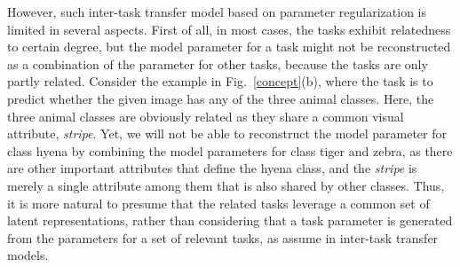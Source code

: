 \documentclass{article}
\begin{document}
	However, such inter-task transfer model based on parameter regularization is limited in several aspects. First of all, in most cases, the tasks exhibit relatedness to certain degree, but the model parameter for a task might not be reconstructed as a combination of the parameter for other tasks, because the tasks are only partly related. Consider the example in Fig.~\ref{concept}(b), where the task is to predict whether the given image has any of the three animal classes. Here, the three animal classes are obviously related as they share a common visual attribute, \emph{stripe}. Yet, we will not be able to reconstruct the model parameter for class hyena by combining the model parameters for class tiger and zebra, as there are other important attributes that define the hyena class, and the \emph{stripe} is merely a single attribute among them that is also shared by other classes. Thus, it is more natural to presume that the related tasks leverage a common set of latent representations, rather than considering that a task parameter is generated from the parameters for a set of relevant tasks, as assume in inter-task transfer models.
	
	\begin{figure*}
		\begin{center}
			\hfill
			\hfill
			\hfill
			\hfill
			\caption{\small \textbf{Concept.} (a) Feature-sharing multi-task learning models such as Go-MTL suffers from negative transfer from unreliable predictors, which can result in learning noisy representations. (b) AMTL, an inter-task transfer asymmetric multi-task learning model that enforces the parameter of each task predictor to be generated as a linear combination of the parameters of relevant task predictors, may not make sense when the tasks are only partially related. (c) Our asymmetric multi-task feature learning enforces the learning of shared representations to be affected only by reliable predictors, and thus the learned features can transfer knowledge to unreliable predictors.}\label{concept}
		\end{center}
		\vspace{-0.12in}
	\end{figure*}
	
\end{document}
